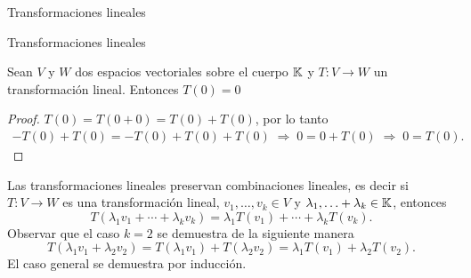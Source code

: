 \begin{chapter}{Transformaciones lineales}
\begin{section}{Transformaciones lineales}
        \begin{observacion*}	Sean $V$ y $W$ dos espacios vectoriales sobre el cuerpo $\mathbb K$ y 	 $T:V \to W$			un transformación lineal. Entonces $T(0) =0$
        \end{observacion*}
        \begin{proof} $T(0) = T(0+0) = T(0) + T(0)$, por lo tanto 
            \begin{align*}
                -T(0) + T(0) = -T(0) + T(0)+T(0) \;\Rightarrow\; 0 = 0 +T(0) \;\Rightarrow\; 0= T(0).
            \end{align*}
        \end{proof}
        
        \begin{observacion*}
            Las transformaciones lineales preservan  combinaciones lineales, es decir si $T:V \to W$ es una transformación lineal, $ v_1,\ldots,v_k \in V$ y $\lambda_1, \ldots+ \lambda_k \in \mathbb K$,  entonces
            $$
            T(\lambda_1 v_1 + \cdots+ \lambda_k v_k) = \lambda_1 T(v_1) + \cdots+ \lambda_k T(v_k).
            $$
            Observar que el caso $k=2$ se demuestra de la siguiente manera
            $$
            T(\lambda_1 v_1 +  \lambda_2 v_2) =T(\lambda_1 v_1) + T(\lambda_2 v_2) =\lambda_1 T(v_1) + \lambda_2T( v_2).
            $$
            El caso general se demuestra por inducción. 
        
        \end{observacion*}
        

\end{section}
\end{chapter}
